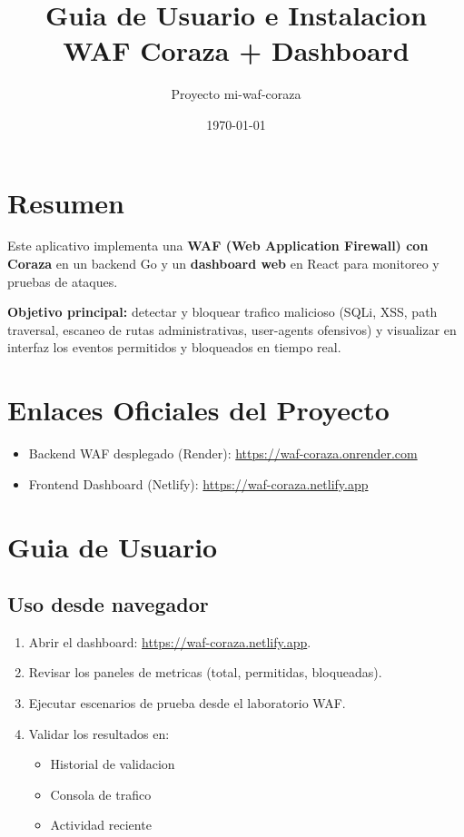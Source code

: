 \documentclass[12pt,a4paper]{article}
\title{Guia de Usuario e Instalacion\\WAF Coraza + Dashboard}
\author{Proyecto mi-waf-coraza}
\date{\today}
\begin{document}
\maketitle
\tableofcontents
\newpage

\section{Resumen}
Este aplicativo implementa una \textbf{WAF (Web Application Firewall) con Coraza} en un backend Go y un \textbf{dashboard web} en React para monitoreo y pruebas de ataques.

\textbf{Objetivo principal:} detectar y bloquear trafico malicioso (SQLi, XSS, path traversal, escaneo de rutas administrativas, user-agents ofensivos) y visualizar en interfaz los eventos permitidos y bloqueados en tiempo real.

\section{Enlaces Oficiales del Proyecto}
\begin{itemize}
  \item Backend WAF desplegado (Render): \href{https://waf-coraza.onrender.com}{https://waf-coraza.onrender.com}
  \item Frontend Dashboard (Netlify): \href{https://waf-coraza.netlify.app}{https://waf-coraza.netlify.app}
\end{itemize}

\section{Guia de Usuario}
\subsection{Uso desde navegador}
\begin{enumerate}
  \item Abrir el dashboard: \href{https://waf-coraza.netlify.app}{https://waf-coraza.netlify.app}.
  \item Revisar los paneles de metricas (total, permitidas, bloqueadas).
  \item Ejecutar escenarios de prueba desde el laboratorio WAF.
  \item Validar los resultados en:
  \begin{itemize}
    \item Historial de validacion
    \item Consola de trafico
    \item Actividad reciente
  \end{itemize}
\end{enumerate}
\end{document}
